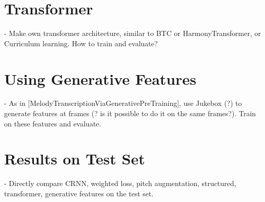 \section{Transformer}

- Make own transformer architecture, similar to BTC or HarmonyTransformer, or Curriculum learning. How to train and evaluate?

\section{Using Generative Features}

- As in [MelodyTranscriptionViaGenerativePreTraining], use Jukebox (?) to generate features at frames (? is it possible to do it on the same frames?). Train on these features and evaluate.

\section{Results on Test Set}

- Directly compare CRNN, weighted loss, pitch augmentation, structured, transformer, generative features on the test set.